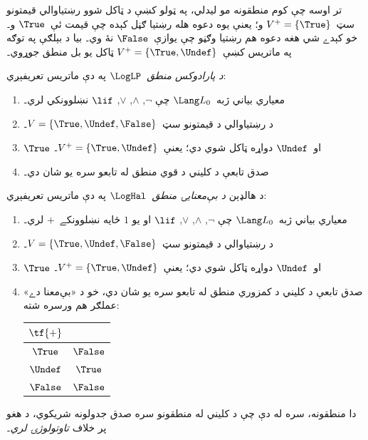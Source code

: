 \documentclass[../../../include/open-logic-section]{subfiles}
\begin{document}


تر اوسه چې کوم منطقونه مو ليدلي، په ټولو کښې د ټاکل شوو
رښتياوالي قيمتونو سټ~$V^+ = \{\True\}$ و؛ يعنې يوه دعوه هله
رښتيا ګڼل کېده چې قيمت ئې~$\True$ و۔ خو کېدے شي هغه دعوه هم
رښتيا وګڼو چې يوازې~$\False$ نۀ وي۔ بيا د بېلګې په توګه په
ماتريس کښې~$V^+ = \{\True, \Undef\}$ ټاکل يو بل منطق جوړوي۔

\begin{defn}
\emph{د پارادوکس منطق}~$\LogLP$ په دې ماتريس تعريفېږي:
\begin{enumerate}
  \item معياري بياني ژبه~$\Lang L_0$ چې
  $\lnot$, $\land$, $\lor$, $\lif$
  نښلوونکي لري۔
  \item د رښتياوالي د قيمتونو سټ~$V = \{\True, \Undef, \False\}$۔
  \item $\True$ او~$\Undef$ دواړه ټاکل شوي دي؛ يعنې~$V^+ = \{\True, \Undef\}$۔
  \item صدق تابعې د کليني د قوي منطق له تابعو سره يو شان دي۔
\end{enumerate}
\end{defn}

\begin{defn}
د هالډېن \emph{د بې‌معنايۍ منطق}~$\LogHal$ په دې ماتريس تعريفېږي:
\begin{enumerate}
  \item معياري بياني ژبه~$\Lang L_0$ چې
  $\lnot$, $\land$, $\lor$, $\lif$
  او يو $1$ ځايه نښلوونکے~$+$ لري۔
  \item د رښتياوالي د قيمتونو سټ~$V = \{\True, \Undef, \False\}$۔
  \item $\True$ او~$\Undef$ دواړه ټاکل شوي دي؛ يعنې~$V^+ = \{\True, \Undef\}$۔
  \item صدق تابعې د کليني د کمزوري منطق له تابعو سره يو شان دي،
  خو د «بې‌معنا دے» عملګر هم ورسره شته:
  \begin{center}
    \begin{tabular}{c|c} 
    $\tf{+}$ & \\ 
    \hline  
    $\True$ & $\False$ \\ 
    $\Undef$ & $\True$ \\
    $\False$ & $\False$ 
    \end{tabular}
  \end{center}
\end{enumerate}
\end{defn}

دا منطقونه، سره له دې چې د کليني له منطقونو سره صدق جدولونه
شريکوي، د هغو پر خلاف \emph{تاوتولوژۍ لري}۔
\end{document}
